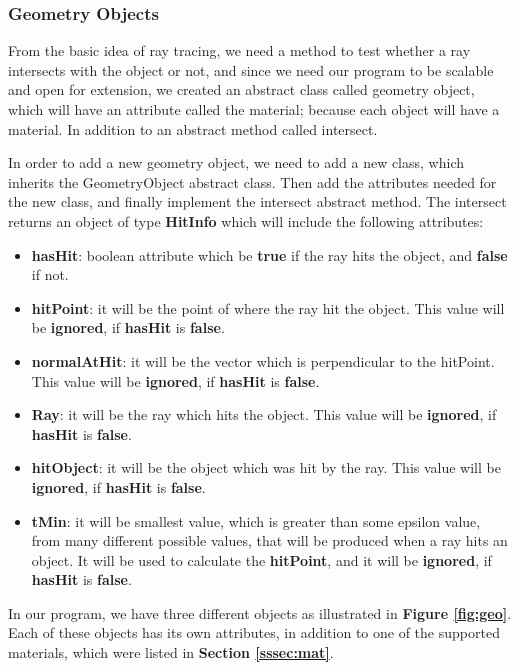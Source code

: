 \documentclass[a4paper]{report}
\begin{document}
	\subsubsection{Geometry Objects}
	\label{sssec:geo}From the basic idea of ray tracing, we need a method to test whether a ray intersects with the object or not, and since we need our program to be scalable and open for extension, we created an abstract class called geometry object, which will have an attribute called the material; because each object will have a material. In addition to an abstract method called intersect. \\
	\par In order to add a new geometry object, we need to add a new class, which inherits the GeometryObject abstract class. Then add the attributes needed for the new class, and finally implement the intersect abstract method. The intersect returns an object of type \textbf{HitInfo} which will include the following attributes:
	\begin{itemize}
		\item \textbf{hasHit}: boolean attribute which be \textbf{true} if the ray hits the object, and \textbf{false} if not.
		\item \textbf{hitPoint}: it will be the point of where the ray hit the object. This value will be \textbf{ignored}, if \textbf{hasHit} is \textbf{false}.
		\item \textbf{normalAtHit}: it will be the vector which is perpendicular to the hitPoint. This value will be \textbf{ignored}, if \textbf{hasHit} is \textbf{false}.
		\item \textbf{Ray}: it will be the ray which hits the object. This value will be \textbf{ignored}, if \textbf{hasHit} is \textbf{false}.
		\item \textbf{hitObject}: it will be the object which was hit by the ray. This value will be \textbf{ignored}, if \textbf{hasHit} is \textbf{false}.
		\item \textbf{tMin}: it will be smallest value, which is greater than some epsilon value, from many different possible values, that will be produced when a ray hits an object. It will be used to calculate the \textbf{hitPoint}, and it will be \textbf{ignored}, if \textbf{hasHit} is \textbf{false}.
	\end{itemize}
	\par In our program, we have three different objects as illustrated in \textbf{Figure \ref{fig:geo}}. Each of these objects has its own attributes, in addition to one of the supported materials, which were listed in \textbf{Section \ref{sssec:mat}}.
\end{document}
